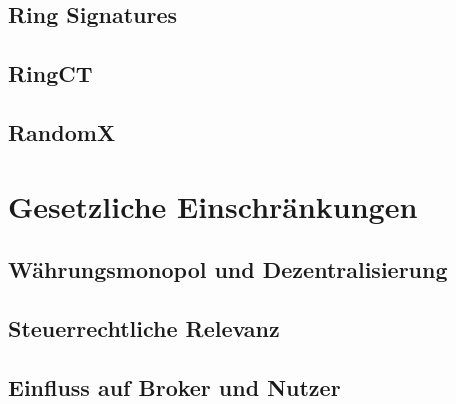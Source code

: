 \section{Ring Signatures} \label{ringsig}

\section{RingCT} \label{ringct}

\section{RandomX}

\chapter{Gesetzliche Einschränkungen} \label{legal}

\section{Währungsmonopol und Dezentralisierung}

\section{Steuerrechtliche Relevanz}

\section{Einfluss auf Broker und Nutzer}